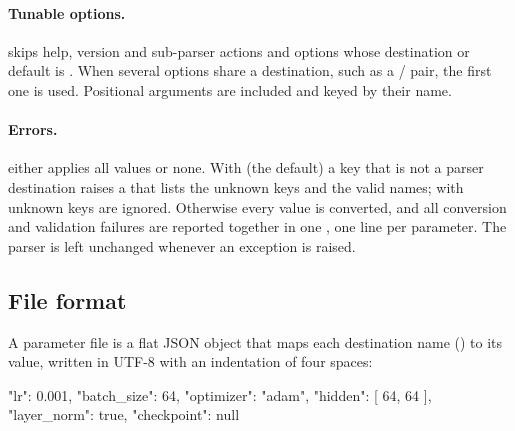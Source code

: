 \paragraph{Tunable options.}
 skips help, version and sub-parser actions and options
whose destination or default is . When several options
share a destination, such as a / pair, the first
one is used. Positional arguments are included and keyed by their name.

\paragraph{Errors.}
 either applies all values or none. With
 (the default) a key that is not a parser destination raises
a  that lists the unknown keys and the valid names; with
 unknown keys are ignored. Otherwise every value is
converted, and all conversion and validation failures are reported together
in one , one line per parameter. The parser is left unchanged
whenever an exception is raised.

\subsection{File format}\label{sec:parakit-format}

A parameter file is a flat JSON object that maps each destination name
() to its value, written in UTF-8 with an indentation of four
spaces:

\begin{textcode}
{
    "lr": 0.001,
    "batch_size": 64,
    "optimizer": "adam",
    "hidden": [
        64,
        64
    ],
    "layer_norm": true,
    "checkpoint": null
}
\end{textcode}

